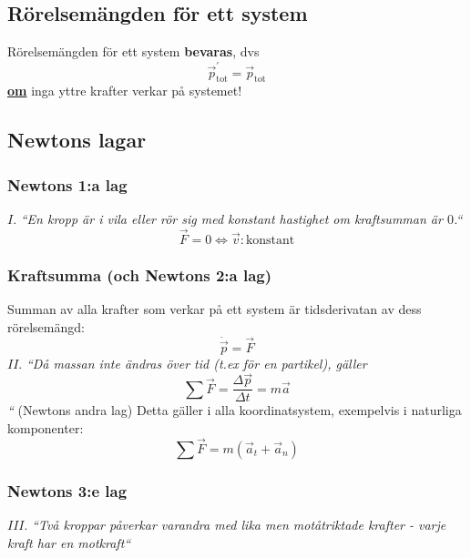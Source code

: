 \documentclass{article}
\newenvironment{ankiflashcard}[1]{}{}
\begin{document}
\begin{paracol}{2}
\begin{ankiflashcard}{Vad är sant om rörelsemängdslagen för ett system?}
\subsection{Rörelsemängden för ett system}
Rörelsemängden för ett system \textbf{bevaras}, dvs
$$\vec p_{\text{tot}}^{\prime} = \vec p_{\text{tot}}$$ \underline{\textbf{om}} inga yttre krafter verkar på systemet!
\end{ankiflashcard}

\subsection{Newtons lagar}
\begin{ankiflashcard}{Vad säger Newtons första lag?}
    
\subsubsection{Newtons 1:a lag}
$I.$ \textit{``En kropp är i vila eller rör sig med konstant hastighet om kraftsumman är $0$.``}
$$\vec F = 0 \iff \vec v: \text{konstant}$$
\end{ankiflashcard}

\begin{ankiflashcard}{Forumlera Newtons andra lag}
\subsubsection{Kraftsumma (och Newtons 2:a lag)}
Summan av alla krafter som verkar på ett system är tidsderivatan av dess rörelsemängd:
$$\dot{\vec p} = \vec F$$
$II.$ \textit{``Då massan inte ändras över tid (t.ex för en partikel), gäller
$$\sum \vec F= \frac{\Delta \vec p}{\Delta t} = m\vec a$$``}
(Newtons andra lag)
Detta gäller i alla koordinatsystem, exempelvis i naturliga komponenter:
$$\sum \vec F = m(\vec a_t + \vec a_n)$$
\end{ankiflashcard}

\begin{ankiflashcard}{Formulera Newtons tredje lag}
\subsubsection{Newtons 3:e lag}
$III.$ \textit{``Två kroppar påverkar varandra med lika men motåtriktade krafter - varje kraft har en motkraft``}
\end{ankiflashcard}


\end{paracol}
\end{document}
